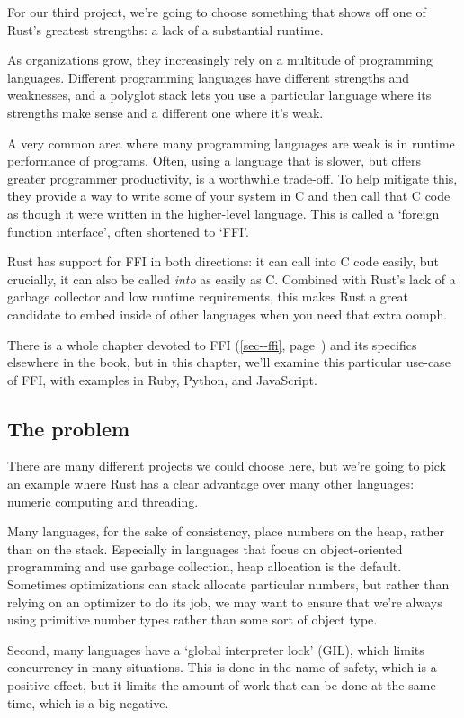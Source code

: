 \documentclass[a4paper,]{book}
\renewcommand*{\hyperref}[2][\ar]{%
  \def\ar{#2}%
  #2 (\autoref{#1}, page~\pageref{#1})}
\begin{document}
For our third project, we're going to choose something that shows off
one of Rust's greatest strengths: a lack of a substantial runtime.

As organizations grow, they increasingly rely on a multitude of
programming languages. Different programming languages have different
strengths and weaknesses, and a polyglot stack lets you use a particular
language where its strengths make sense and a different one where it's
weak.

A very common area where many programming languages are weak is in
runtime performance of programs. Often, using a language that is slower,
but offers greater programmer productivity, is a worthwhile trade-off.
To help mitigate this, they provide a way to write some of your system
in C and then call that C code as though it were written in the
higher-level language. This is called a `foreign function interface',
often shortened to `FFI'.

Rust has support for FFI in both directions: it can call into C code
easily, but crucially, it can also be called \emph{into} as easily as C.
Combined with Rust's lack of a garbage collector and low runtime
requirements, this makes Rust a great candidate to embed inside of other
languages when you need that extra oomph.

There is a whole \hyperref[sec--ffi]{chapter devoted to FFI} and its
specifics elsewhere in the book, but in this chapter, we'll examine this
particular use-case of FFI, with examples in Ruby, Python, and
JavaScript.

\subsection{The problem}\label{the-problem}

There are many different projects we could choose here, but we're going
to pick an example where Rust has a clear advantage over many other
languages: numeric computing and threading.

Many languages, for the sake of consistency, place numbers on the heap,
rather than on the stack. Especially in languages that focus on
object-oriented programming and use garbage collection, heap allocation
is the default. Sometimes optimizations can stack allocate particular
numbers, but rather than relying on an optimizer to do its job, we may
want to ensure that we're always using primitive number types rather
than some sort of object type.

Second, many languages have a `global interpreter lock' (GIL), which
limits concurrency in many situations. This is done in the name of
safety, which is a positive effect, but it limits the amount of work
that can be done at the same time, which is a big negative.
\end{document}
